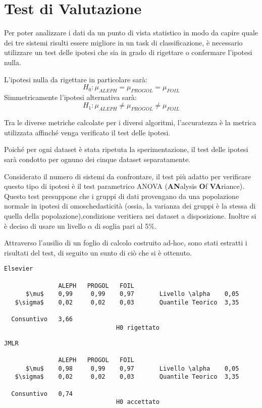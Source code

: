 \section{Test di Valutazione}
Per poter analizzare i dati da un punto di vista statistico in modo da capire quale dei tre sistemi risulti essere migliore in un task di classificazione, è necessario utilizzare un test delle ipotesi che sia in grado di rigettare o confermare l'ipotesi nulla.

L'ipotesi nulla da rigettare in particolare sarà:
$$H_0 : \mu_{ALEPH} = \mu_{PROGOL} = \mu_{FOIL} $$
Simmetricamente l'ipotesi alternativa sarà:
$$H_1 : \mu_{ALEPH} \neq \mu_{PROGOL} \neq \mu_{FOIL} $$

Tra le diverse metriche calcolate per i diversi algoritmi, l'accuratezza è la metrica utilizzata affinché venga verificato il test delle ipotesi.

Poiché per ogni dataset è stata ripetuta la sperimentazione, il test delle ipotesi sarà condotto per ognuno dei cinque dataset separatamente.

Considerato il numero di sistemi da confrontare, il test più adatto per verificare questo tipo di ipotesi è il test parametrico ANOVA (\textbf{AN}alysis \textbf{O}f \textbf{VA}riance). Questo test presuppone che i gruppi di dati provengano da una popolazione normale in ipotesi di omoschedasticità (ossia, la varianza dei gruppi è la stessa di quella della popolazione),condizione veritiera nei dataset a disposizione. Inoltre si è deciso di usare un livello $\alpha$ di soglia pari al 5\%.

Attraverso l'ausilio di un foglio di calcolo costruito ad-hoc, sono stati estratti i risultati del test, di seguito un sunto di ciò che si è ottenuto.

\begin{verbatim}
Elsevier

               ALEPH   PROGOL   FOIL
      $\mu$    0,99     0,99    0,97       Livello \alpha    0,05
   $\sigma$    0,02     0,02    0,03       Quantile Teorico  3,35
     
  Consuntivo   3,66
                               H0 rigettato
\end{verbatim}

\begin{verbatim}
JMLR

               ALEPH   PROGOL   FOIL
      $\mu$    0,98     0,99    0,97       Livello \alpha    0,05
   $\sigma$    0,02     0,02    0,03       Quantile Teorico  3,35
     
  Consuntivo   0,74
                               H0 accettato
\end{verbatim}

